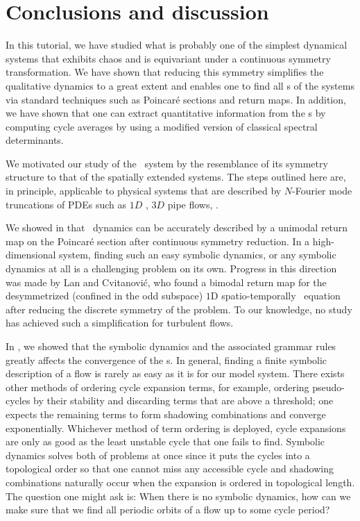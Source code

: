 \section{Conclusions and discussion}
\label{s:concl}

In this tutorial, we have studied what is probably one of the simplest dynamical systems that
exhibits chaos and is equivariant under a continuous symmetry transformation.
We have shown that reducing this symmetry simplifies the qualitative dynamics
to a great extent and enables one to find all \rpo s of the systems via
standard techniques such as Poincar\'e sections and return maps. In
addition, we have shown that one can extract quantitative information
from the \rpo s by computing cycle averages by using a modified version of
classical spectral determinants.

We motivated our study of the \twomode\ system by the resemblance of its
symmetry structure to that of the spatially extended systems. The
steps outlined here are, in principle, applicable to physical systems
that are described by $N$-Fourier mode truncations of PDEs such as $1D$
\KS{}, $3D$ pipe flows, \etc.

We showed in  that \twomode\ dynamics can be accurately
described by a unimodal return map on the Poincar\'e section after continuous 
symmetry reduction. In a high-dimensional system, finding such an easy symbolic 
dynamics, or any symbolic dynamics at all is a challenging problem on its own. 
Progress in this direction was made by Lan and Cvitanovi\'{c}, who found a bimodal 
return map for the desymmetrized (confined in the odd subspace) $1$D spatio-temporally \KS\ 
equation  after reducing the discrete symmetry of the problem. To our
knowledge, no study has achieved such a simplification for turbulent flows.

In , we showed that the symbolic dynamics and the
associated grammar rules greatly affects the convergence of the \cycForm s.
In general, finding a finite symbolic description of a flow is rarely as easy as 
it is for our model system. There exists other methods of ordering cycle expansion 
terms, for example, ordering pseudo-cycles by their stability and discarding terms
that are above a threshold; one expects the remaining terms to form shadowing 
combinations and converge exponentially. Whichever method of term ordering is 
deployed, cycle expansions are only as good as the least unstable cycle that 
one fails to find. Symbolic dynamics solves both of problems at once since it puts 
the cycles into a topological order so that one cannot miss any accessible cycle 
and shadowing combinations naturally occur when the expansion is ordered in 
topological length. The question one might ask is: When there is no symbolic dynamics, 
how can we make sure that we find all periodic orbits of a flow up to some cycle 
period?

